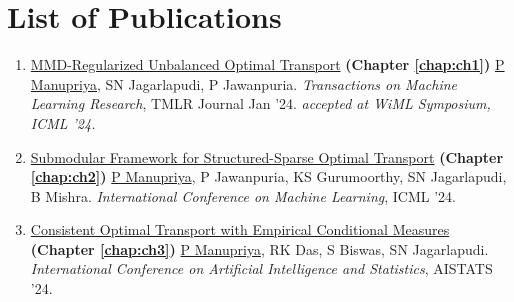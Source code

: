 \chapter*{List of Publications}
\vspace{-0.9in}
\small
\begin{enumerate}
\itemsep-0.5em
    \item  \href{https://openreview.net/forum?id=eN9CjU3h1b}{MMD-Regularized Unbalanced Optimal Transport} \textbf{(Chapter \ref{chap:ch1})}\newline
    \underline{P Manupriya}, SN Jagarlapudi, P Jawanpuria. \newline  \textit{Transactions on Machine Learning Research}, TMLR Journal Jan '24.
     \newline
     {\href{https://drive.google.com/file/d/1COByfGSeWplgM1J-Xu22bhXZYovxLfcc/view?usp=drive_link}{} \textit{accepted at WiML Symposium, ICML '24.}}\\
      \href{https://github.com/Piyushi-0/MMD-reg-OT}{\color{darkgray!90}{Code - https://github.com/Piyushi-0/MMD-reg-OT}}
    \item \href{https://arxiv.org/pdf/2406.04914}{Submodular Framework for Structured-Sparse Optimal Transport} \textbf{(Chapter \ref{chap:ch2})} \newline
\underline{P Manupriya}, P Jawanpuria, KS Gurumoorthy, SN Jagarlapudi, B Mishra. \newline 
 \textit{International Conference on Machine Learning}, ICML '24.\newline \href{https://github.com/Piyushi-0/Sparse-UOT}{\color{darkgray!90}{Code - https://github.com/Piyushi-0/Sparse-UOT}}
    \item \href{https://arxiv.org/pdf/2305.15901}{Consistent Optimal Transport with Empirical Conditional Measures} \textbf{(Chapter \ref{chap:ch3})}\newline
    \underline{P Manupriya}, RK Das, S Biswas, SN Jagarlapudi. 
    \newline
     \textit{International Conference on Artificial Intelligence and Statistics}, AISTATS '24.
    \newline \href{https://github.com/atmlr-lab/COT}{\color{darkgray!90}{Code - https://github.com/atmlr-lab/COT}}
\end{enumerate}
\vspace{-0.05in}
